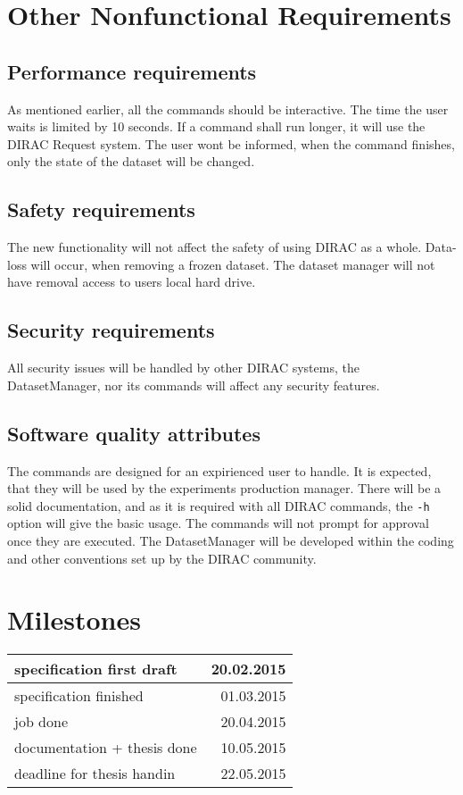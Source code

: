 \documentclass{scrreprt}
\begin{document}
\chapter{Other Nonfunctional Requirements}


\section{Performance requirements} \label{sec:Performance}
As mentioned earlier, all the commands should be interactive. The time the user waits is limited by 10 seconds. If a command shall run longer, it will use the DIRAC Request system. The user wont be informed, when the command finishes, only the state of the dataset will be changed.


\section{Safety requirements}
The new functionality will not affect the safety of using DIRAC as a whole. Data-loss will occur, when removing a frozen dataset. The dataset manager will not have removal access to users local hard drive.


\section{Security requirements}
All security issues will be handled by other DIRAC systems, the DatasetManager, nor its commands will affect any security features. 

\section{Software quality attributes}
The commands are designed for an expirienced user to handle. It is expected, that they will be used by the experiments production manager. There will be a solid documentation, and as it is required with all DIRAC commands, the \texttt{-h} option will give the basic usage. The commands will not prompt for approval once they are executed. The DatasetManager will be developed within the coding and other conventions set up by the DIRAC community.



\chapter{Milestones}

\begin{tabularx}{\textwidth}{ X r }
\hline
specification first draft & 20.02.2015 \\
\hline
specification finished & 01.03.2015 \\
\hline
job done & 20.04.2015 \\
\hline
documentation + thesis done & 10.05.2015\\
\hline
deadline for thesis handin & 22.05.2015 \\
\hline
\end{tabularx}
\end{document}
